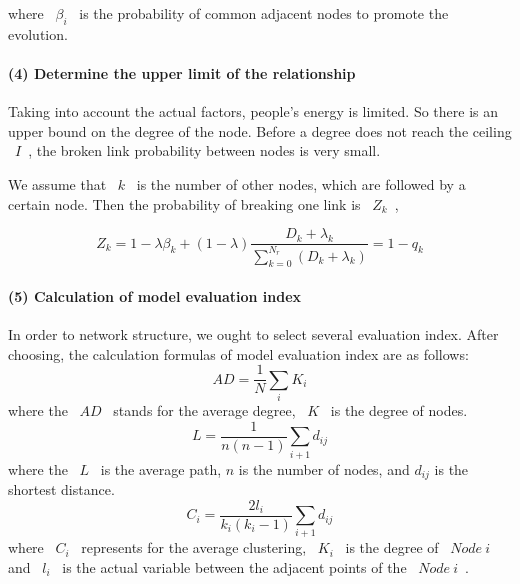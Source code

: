 \documentclass[a4paper,11pt]{article}
\begin{document}
where ~$\beta_i$~ is the probability of common adjacent nodes to promote the evolution.





\paragraph{(4) Determine the upper limit of the relationship}
\text{\\}
\par Taking into account the actual factors, people's energy is limited. So there is an upper bound on the degree of the node. Before a degree does not reach the ceiling ~$I$~, the broken link probability between nodes is very small.
\par We assume that ~$k$~ is the number of other nodes, which are followed by a certain node. Then the probability of breaking one link is ~$Z_k$~,

\begin{equation}
{Z_k}=1-\lambda \beta _k+(1-\lambda ){\frac{{{D_k} + {\lambda _k}}}{{\sum\limits_{k = 0}^{{N_r}} {({D_k} + {\lambda _k})} }}}=1-q_k
\end{equation}



\paragraph{(5) Calculation of model evaluation index}
\text{\\}
\par In order to network structure, we ought to select several evaluation index. After choosing, the calculation formulas of model evaluation index are as follows:
\begin{equation}
AD=\frac{1}{N}{\sum\limits_{i}^{}}{K_i}
\end{equation}
where the ~$AD$~ stands for the average degree, ~$K$~ is the degree of nodes.
\begin{equation}
L=\frac{1}{n(n-1)}{\sum\limits_{i+1}^{}}{d_{ij}}
\end{equation}
where the ~$L$~ is the average path, $n$ is the number of nodes, and $d_{ij}$ is the shortest distance.
\begin{equation}
C_i=\frac{2l_i}{k_i(k_i-1)}{\sum\limits_{i+1}^{}}{d_{ij}}
\end{equation}
where ~$C_i$~ represents for the average clustering, ~$K_i$~ is the degree of ~$Node~i$~ and ~$l_i$~ is the actual variable between the adjacent points of the ~$Node~i$~.
\end{document}
